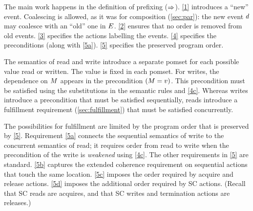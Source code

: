 The main work happens in the definition of prefixing ($\mathbin\Rightarrow$).  \ref{1}
introduces a ``new'' event.  Coalescing is allowed, as it was for composition
(\textsection\ref{sec:par}): the new event $d$ may coalesce with an
``old'' one in $E$.  \ref{2} ensures that no order is removed from old
events.  \ref{3} specifies the actions labelling the events.  \ref{4}
specifies the preconditions (along with \ref{5a}).  \ref{5} specifies the
preserved program order.

The semantics of read and write introduce a separate pomset for each possible
value read or written.  The value is fixed in each pomset.  For writes, the
dependence on $M$ appears in the precondition $(M=v)$.  This
precondition must be satisfied using the substitutions in the semantic rules
and \ref{4c}.  Whereas writes introduce a precondition that must be satisfied
sequentially, reads introduce a fulfillment requirement
(\textsection\ref{sec:fulfillment}) that must be satisfied concurrently.

The possibilities for fulfillment are limited by the program
order that is preserved by \ref{5}.  Requirement \ref{5a} connects
the sequential semantics of write to the concurrent semantics of read; it %
requires order from read to write when the precondition of the write
is \emph{weakened} using \ref{4c}. %
The other requirements in \ref{5} are standard.  \ref{5b} captures the
extended coherence requirement on sequential actions that touch the same location.
\ref{5c} imposes the order required by acquire and release actions.  \ref{5d}
imposes the additional order required by SC actions.  (Recall that SC reads
are acquires, and that SC writes and termination actions are releases.)

